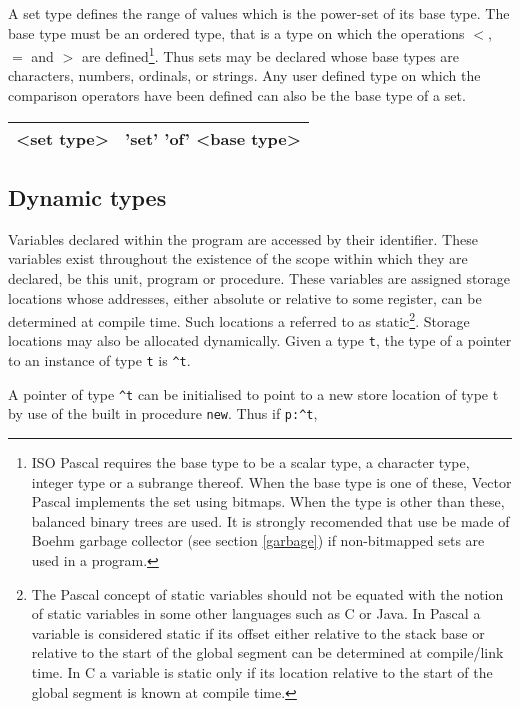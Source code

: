 A set type defines the range of values which is the power-set of
its base type. The base type must be an ordered type, that is a type on which the
operations $<$, $=$ and $>$ are defined\footnote{ ISO Pascal requires
the base type to be a scalar type, a character type, integer
type or a subrange thereof. When the base type is one of these, Vector Pascal implements
the set using bitmaps. When the type is other than these, balanced binary trees are used.
It is strongly recomended that use be made of Boehm garbage collector (see section \ref{garbage}) if non-bitmapped
sets are used in a program.}.
Thus sets may be declared whose base types are characters, numbers, ordinals, or strings. Any user
defined type on which the comparison operators have been defined can also be the base type
of a set.

\vspace{0.3cm}
{\centering \begin{tabular}{|c|c|}
\hline 
<set type>&
'set' 'of' <base type>\\
\hline 
\end{tabular}\par}
\vspace{0.3cm}


\subsection{Dynamic types}

Variables declared within the program are accessed by their identifier. These
variables exist throughout the existence of the scope within which they are
declared, be this unit, program or procedure. These variables are assigned storage
locations whose addresses, either absolute or relative to some register, can
be determined at compile time. Such locations a referred to as static\footnote{%
The Pascal concept of static variables should not be equated with the notion
of static variables in some other languages such as C or Java. In Pascal a variable
is considered static if its offset either relative to the stack base or relative
to the start of the global segment can be determined at compile/link time. In
C a variable is static only if its location relative to the start of the global
segment is known at compile time.
}. Storage locations may also be allocated dynamically. Given a type \texttt{t},
the type of a pointer to an instance of type \texttt{t} is \texttt{\textasciicircum{}t}. 

A pointer of type \texttt{\textasciicircum{}t} can be initialised to point to
a new store location of type t by use of the built in procedure \texttt{new}.
Thus if \texttt{p:\textasciicircum{}t},

